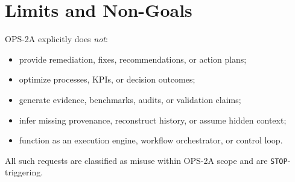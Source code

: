 
\section{Limits and Non-Goals}

OPS-2A explicitly does \emph{not}:
\begin{itemize}[leftmargin=*, itemsep=0.25em]
  \item provide remediation, fixes, recommendations, or action plans;
  \item optimize processes, KPIs, or decision outcomes;
  \item generate evidence, benchmarks, audits, or validation claims;
  \item infer missing provenance, reconstruct history, or assume hidden context;
  \item function as an execution engine, workflow orchestrator, or control loop.
\end{itemize}

All such requests are classified as misuse within OPS-2A scope and are \texttt{STOP}-triggering.
